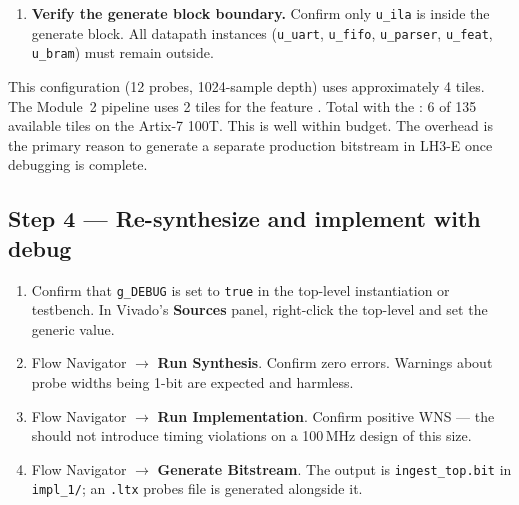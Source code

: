 \documentclass[11pt,letterpaper]{article}
\begin{document}
\begin{enumerate}[leftmargin=2em]
	\item \textbf{Verify the generate block boundary.}
	Confirm only \texttt{u\_ila} is inside the generate block. All datapath instances (\texttt{u\_uart}, \texttt{u\_fifo}, \texttt{u\_parser}, \texttt{u\_feat}, \texttt{u\_bram}) must remain outside.

\end{enumerate}

\begin{tcolorbox}[warning={\ILA{} Block RAM Cost}]
	This configuration (12 probes, 1024-sample depth) uses approximately 4 \BRAM{} tiles. The Module~2 pipeline uses 2 \BRAM{} tiles for the feature \BRAM{}. Total with the \ILA{}: 6 of 135 available \BRAM{} tiles on the Artix-7 100T. This is well within budget. The \ILA{} overhead is the primary reason to generate a separate production bitstream in LH3-E once debugging is complete.
\end{tcolorbox}

\subsection{Step 4 --- Re-synthesize and implement with debug}
\begin{enumerate}[leftmargin=2em]
	\item Confirm that \texttt{g\_DEBUG} is set to \texttt{true} in the top-level instantiation or testbench. In Vivado's \textbf{Sources} panel, right-click the top-level and set the generic value.
	\item Flow Navigator $\to$ \textbf{Run Synthesis}. Confirm zero errors. Warnings about \ILA{} probe widths being 1-bit are expected and harmless.
	\item Flow Navigator $\to$ \textbf{Run Implementation}. Confirm positive \mbox{WNS} --- the \ILA{} should not introduce timing violations on a 100\,MHz design of this size.
	\item Flow Navigator $\to$ \textbf{Generate Bitstream}. The output is \texttt{ingest\_top.bit} in \texttt{impl\_1/}; an \texttt{.ltx} probes file is generated alongside it.
\end{enumerate}

\end{document}
